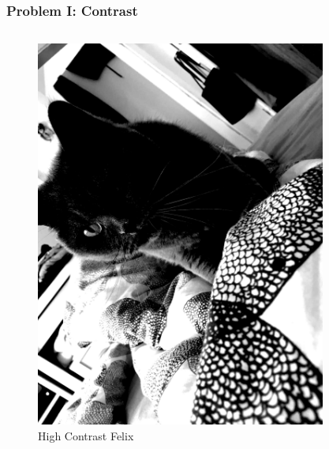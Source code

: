 \begin{frame}
	\frametitle{Problem I: Contrast}
	\begin{columns}
		\begin{column}{0.5\textwidth}
			\begin{figure}
				\centering
				\includegraphics[width=0.8\linewidth]{images/KadseHighContrast}
				\caption[High Contrast Felix]{High Contrast Felix}
				\label{fig:HighContrast}
			\end{figure}
		\end{column}
		\begin{column}{0.5\textwidth} 
			\begin{center}
				\begin{figure}
					\centering

\end{figure}
\end{center}
\end{column}
\end{columns}
\end{frame}
